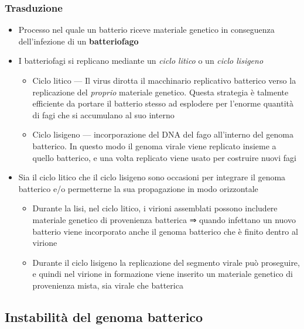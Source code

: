 \documentclass[italian,]{article}
\providecommand{\tightlist}{%
  \setlength{\itemsep}{0pt}\setlength{\parskip}{0pt}}
\begin{document}
\hypertarget{trasduzione}{%
\subsubsection{Trasduzione}\label{trasduzione}}

\begin{itemize}
\tightlist
\item
  Processo nel quale un batterio riceve materiale genetico in
  conseguenza dell'infezione di un \textbf{batteriofago}
\item
  I batteriofagi si replicano mediante un \emph{ciclo litico} o un
  \emph{ciclo lisigeno}

  \begin{itemize}
  \tightlist
  \item
    Ciclo litico --- Il virus dirotta il macchinario replicativo
    batterico verso la replicazione del \emph{proprio} materiale
    genetico. Questa strategia è talmente efficiente da portare il
    batterio stesso ad esplodere per l'enorme quantità di fagi che si
    accumulano al suo interno
  \item
    Ciclo lisigeno --- incorporazione del DNA del fago all'interno del
    genoma batterico. In questo modo il genoma virale viene replicato
    insieme a quello batterico, e una volta replicato viene usato per
    costruire nuovi fagi
  \end{itemize}
\item
  Sia il ciclo litico che il ciclo lisigeno sono occasioni per integrare
  il genoma batterico e/o permetterne la sua propagazione in modo
  orizzontale

  \begin{itemize}
  \tightlist
  \item
    Durante la lisi, nel ciclo litico, i virioni assemblati possono
    includere materiale genetico di provenienza batterica ⇒ quando
    infettano un nuovo batterio viene incorporato anche il genoma
    batterico che è finito dentro al virione
  \item
    Durante il ciclo lisigeno la replicazione del segmento virale può
    proseguire, e quindi nel virione in formazione viene inserito un
    materiale genetico di provenienza mista, sia virale che batterica
  \end{itemize}
\end{itemize}

\hypertarget{instabilituxe0-del-genoma-batterico}{%
\subsection{Instabilità del genoma
batterico}\label{instabilituxe0-del-genoma-batterico}}
\end{document}
